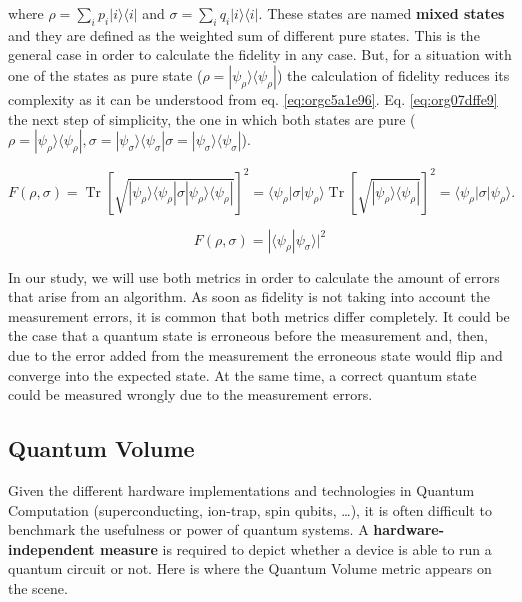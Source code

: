 where \(\rho =\sum _{i}p_{i}|i\rangle \langle i|\) and \(\sigma =\sum _{i}q_{i}|i\rangle \langle i|\).
These states are named \textbf{mixed states} and they are defined as the weighted sum of different pure states.
This is the general case in order to calculate the fidelity in any case.
But, for a situation with one of the states as pure state (\({\displaystyle \rho =|\psi _{\rho }\rangle \!\langle \psi _{\rho }|}\)) the calculation of fidelity reduces its complexity as it can be understood from eq. \ref{eq:orgc5a1e96}.
Eq. \ref{eq:org07dffe9} the next step of simplicity, the one in which both states are pure (\({\displaystyle \rho =|\psi _{\rho }\rangle \!\langle \psi _{\rho }|}, {\displaystyle \sigma =|\psi _{\sigma }\rangle \!\langle \psi _{\sigma }|} {\displaystyle \sigma =|\psi _{\sigma }\rangle \!\langle \psi _{\sigma }|}\)).


\begin{equation}
\label{eq:orgc5a1e96}
{\displaystyle F(\rho ,\sigma )=\operatorname {Tr} \left[{\sqrt {|\psi _{\rho }\rangle \langle \psi _{\rho }|\sigma |\psi _{\rho }\rangle \langle \psi _{\rho }|}}\right]^{2}=\langle \psi _{\rho }|\sigma |\psi _{\rho }\rangle \operatorname {Tr} \left[{\sqrt {|\psi _{\rho }\rangle \langle \psi _{\rho }|}}\right]^{2}=\langle \psi _{\rho }|\sigma |\psi _{\rho }\rangle .}
\end{equation}

\begin{equation}
\label{eq:org07dffe9}
{\displaystyle F(\rho ,\sigma )=|\langle \psi _{\rho }|\psi _{\sigma }\rangle |^{2}}
\end{equation}




In our study, we will use both metrics in order to calculate the amount of errors that arise from an algorithm.
As soon as fidelity is not taking into account the measurement errors, it is common that both metrics differ completely.
It could be the case that a quantum state is erroneous before the measurement and, then, due to the error added from the measurement the erroneous state would flip and converge into the expected state.
At the same time, a correct quantum state could be measured wrongly due to the measurement errors.

\subsection{Quantum Volume}
\label{sec:orgdd9ad01}

Given the different hardware implementations and technologies in Quantum Computation (superconducting, ion-trap, spin qubits, \ldots{}), it is often difficult to benchmark the usefulness or power of quantum systems. 
A \textbf{hardware-independent measure} is required to depict whether a device is able to run a quantum circuit or not.
Here is where the Quantum Volume metric appears on the scene.


